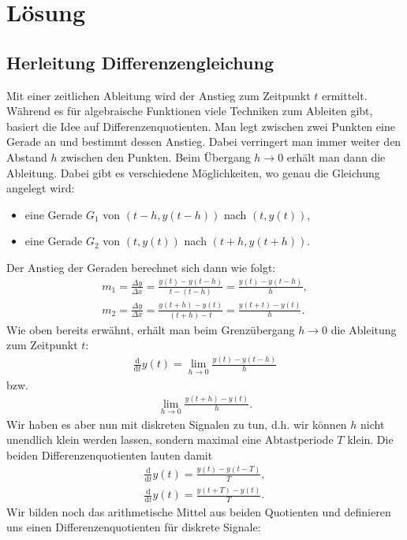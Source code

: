 \documentclass[11pt,a4paper,DIV=12]{scrartcl}
\begin{document}
\section{Lösung}
	
\subsection{Herleitung Differenzengleichung}
Mit einer zeitlichen Ableitung wird der Anstieg zum Zeitpunkt $t$ ermittelt. Während es für algebraische Funktionen viele Techniken zum Ableiten gibt, basiert die Idee auf Differenzenquotienten. Man legt zwischen zwei Punkten eine Gerade an und bestimmt dessen Anstieg. Dabei verringert man immer weiter den Abstand $h$ zwischen den Punkten. Beim Übergang $h\rightarrow0$ erhält man dann die Ableitung. Dabei gibt es verschiedene Möglichkeiten, wo genau die Gleichung angelegt wird:\\
\begin{itemize}
	\item eine Gerade $G_1$ von $(t-h,y(t-h))$ nach $(t,y(t))$,
	\item eine Gerade $G_2$ von $(t,y(t))$ nach $(t+h,y(t+h))$.
\end{itemize}
Der Anstieg der Geraden berechnet sich dann wie folgt:
\begin{gather}
	m_1=\frac{\Delta y}{\Delta x}=\frac{y(t)-y(t-h)}{t-(t-h)}=\frac{y(t)-y(t-h)}{h},\\
	m_2=\frac{\Delta y}{\Delta x}=\frac{y(t+h)-y(t)}{(t+h)-t}=\frac{y(t+t)-y(t)}{h}.
\end{gather}
Wie oben bereits erwähnt, erhält man beim Grenzübergang $h\rightarrow0$ die Ableitung zum Zeitpunkt $t$:
\begin{align}
	\frac{\mathrm{d}}{\mathrm{d}t}y(t)=\lim\limits_{h\rightarrow0}\frac{y(t)-y(t-h)}{h}
\end{align}
bzw.
\begin{gather}
	\lim\limits_{h\rightarrow0}\frac{y(t+h)-y(t)}{h}.
\end{gather}
Wir haben es aber nun mit diskreten Signalen zu tun, d.h. wir können $h$ nicht unendlich klein werden lassen, sondern maximal eine Abtastperiode $T$ klein. Die beiden Differenzenquotienten lauten damit
\begin{gather}
	\frac{\mathrm{d}}{\mathrm{d}t}y(t)=\frac{y(t)-y(t-T)}{T},\\
	\frac{\mathrm{d}}{\mathrm{d}t}y(t)=\frac{y(t+T)-y(t)}{T}.
\end{gather}
Wir bilden noch das arithmetische Mittel aus beiden Quotienten und definieren uns einen Differenzenquotienten für diskrete Signale:
\end{document}
